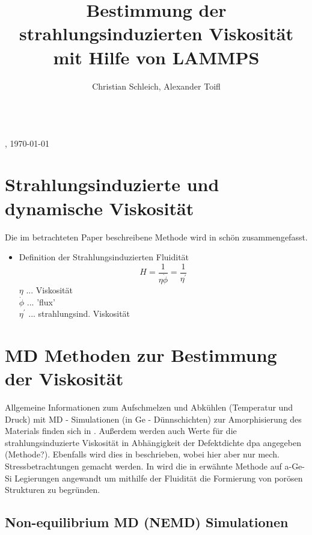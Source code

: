 \documentclass[a4paper, 10pt, 
               numbers=noenddot, toc=graduated,
               headsepline=true, footsepline=true,
               twoside=false, titlepage=true, 
               bibliography=totoc]{scrartcl}
\begin{document}
\title{Bestimmung der strahlungsinduzierten Viskosit{\"a}t mit Hilfe von LAMMPS}
\author{Christian Schleich, Alexander Toifl}

\begin{center}
\huge{\thetitle} \\
\small{\theauthor, \today}
\end{center}

\hspace{1 cm}


\section{Strahlungsinduzierte und dynamische Viskosität}

Die im betrachteten Paper \cite{Mayr2003} beschreibene Methode wird in \cite{hobler2017hpm} schön zusammengefasst.

\begin{itemize}
	 \item Definition der Strahlungsinduzierten Fluidität 
	 	\begin{equation}
	  		H = \frac 1 {\eta \dot{\phi}} = \frac 1 {\eta^{'}}
		\end{equation}  
		$\eta$ ... Viskosität\\
		$\dot{\phi}$ ... 'flux'\\
		$\eta^{'}$ ... strahlungsind. Viskosität \cite{Mayr2003}
\end{itemize}


\section{MD Methoden zur Bestimmung der Viskosität}

Allgemeine Informationen zum Aufschmelzen und Abkühlen (Temperatur und Druck) mit MD - Simulationen (in Ge - Dünnschichten) zur Amorphisierung des Materials finden sich in \cite{Mayr2005}. Außerdem werden auch Werte für die strahlungsinduzierte Viskosität in Abhängigkeit der Defektdichte dpa angegeben (Methode?). Ebenfalls wird dies in \cite{Edler2007} beschrieben, wobei hier aber nur mech. Stressbetrachtungen gemacht werden. In \cite{Lehnert2017} wird die in \cite{Mayr2003} erwähnte Methode auf a-Ge-Si Legierungen angewandt um mithilfe der Fluidität die Formierung von porösen Strukturen zu begründen.


\subsection{Non-equilibrium MD (NEMD) Simulationen}
\end{document}
